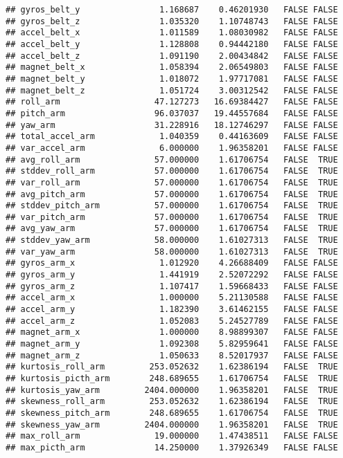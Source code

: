 \documentclass[]{article}
\begin{document}
\begin{verbatim}
## gyros_belt_y                1.168687    0.46201930   FALSE FALSE
## gyros_belt_z                1.035320    1.10748743   FALSE FALSE
## accel_belt_x                1.011589    1.08030982   FALSE FALSE
## accel_belt_y                1.128808    0.94442180   FALSE FALSE
## accel_belt_z                1.091190    2.00434842   FALSE FALSE
## magnet_belt_x               1.058394    2.06549803   FALSE FALSE
## magnet_belt_y               1.018072    1.97717081   FALSE FALSE
## magnet_belt_z               1.051724    3.00312542   FALSE FALSE
## roll_arm                   47.127273   16.69384427   FALSE FALSE
## pitch_arm                  96.037037   19.44557684   FALSE FALSE
## yaw_arm                    31.228916   18.12746297   FALSE FALSE
## total_accel_arm             1.040359    0.44163609   FALSE FALSE
## var_accel_arm               6.000000    1.96358201   FALSE FALSE
## avg_roll_arm               57.000000    1.61706754   FALSE  TRUE
## stddev_roll_arm            57.000000    1.61706754   FALSE  TRUE
## var_roll_arm               57.000000    1.61706754   FALSE  TRUE
## avg_pitch_arm              57.000000    1.61706754   FALSE  TRUE
## stddev_pitch_arm           57.000000    1.61706754   FALSE  TRUE
## var_pitch_arm              57.000000    1.61706754   FALSE  TRUE
## avg_yaw_arm                57.000000    1.61706754   FALSE  TRUE
## stddev_yaw_arm             58.000000    1.61027313   FALSE  TRUE
## var_yaw_arm                58.000000    1.61027313   FALSE  TRUE
## gyros_arm_x                 1.012920    4.26688409   FALSE FALSE
## gyros_arm_y                 1.441919    2.52072292   FALSE FALSE
## gyros_arm_z                 1.107417    1.59668433   FALSE FALSE
## accel_arm_x                 1.000000    5.21130588   FALSE FALSE
## accel_arm_y                 1.182390    3.61462155   FALSE FALSE
## accel_arm_z                 1.052083    5.24527789   FALSE FALSE
## magnet_arm_x                1.000000    8.98899307   FALSE FALSE
## magnet_arm_y                1.092308    5.82959641   FALSE FALSE
## magnet_arm_z                1.050633    8.52017937   FALSE FALSE
## kurtosis_roll_arm         253.052632    1.62386194   FALSE  TRUE
## kurtosis_picth_arm        248.689655    1.61706754   FALSE  TRUE
## kurtosis_yaw_arm         2404.000000    1.96358201   FALSE  TRUE
## skewness_roll_arm         253.052632    1.62386194   FALSE  TRUE
## skewness_pitch_arm        248.689655    1.61706754   FALSE  TRUE
## skewness_yaw_arm         2404.000000    1.96358201   FALSE  TRUE
## max_roll_arm               19.000000    1.47438511   FALSE FALSE
## max_picth_arm              14.250000    1.37926349   FALSE FALSE

\end{verbatim}
\end{document}
